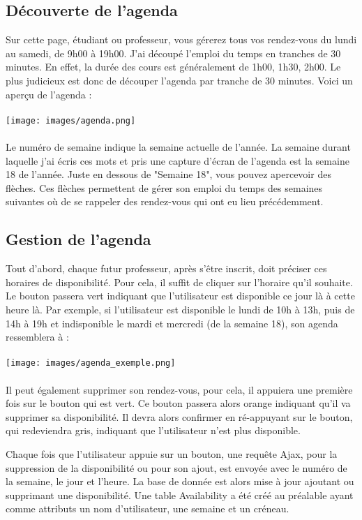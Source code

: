 \documentclass{article}%
\begin{document}
\subsection{Découverte de l'agenda}
Sur cette page, étudiant ou professeur, vous gérerez tous vos rendez-vous du lundi au samedi, de 9h00 à 19h00. J'ai découpé l'emploi du temps en tranches de 30 minutes. En effet, la durée des cours est généralement de 1h00, 1h30, 2h00. Le plus judicieux est donc de découper l'agenda par tranche de 30 minutes. Voici un aperçu de l'agenda : \\\\
\texttt{[image: images/agenda.png]}  \\\\
Le numéro de semaine indique la semaine actuelle de l'année. La semaine durant laquelle j'ai écris ces mots et pris une capture d'écran de l'agenda est la semaine 18 de l'année. Juste en dessous de "Semaine 18", vous pouvez apercevoir des flèches. Ces flèches permettent de gérer son emploi du temps des semaines suivantes où de se rappeler des rendez-vous qui ont eu lieu précédemment. 
\subsection{Gestion de l'agenda}
Tout d'abord, chaque futur professeur, après s'être inscrit, doit préciser ces horaires de disponibilité. Pour cela, il suffit de cliquer sur l'horaire qu'il souhaite. Le bouton passera vert indiquant que l'utilisateur est disponible ce jour là à cette heure là. Par exemple, si l'utilisateur est disponible le lundi de 10h à 13h, puis de 14h à 19h et indisponible le mardi et mercredi (de la semaine 18), son agenda ressemblera à :\\\\
\texttt{[image: images/agenda\_exemple.png]} 
\\\\
 Il peut également supprimer son rendez-vous, pour cela, il appuiera une première fois sur le bouton qui est vert. Ce bouton passera alors orange indiquant qu'il va supprimer sa disponibilité. Il devra alors confirmer en ré-appuyant sur le bouton, qui redeviendra gris, indiquant que l'utilisateur n'est plus disponible. 


Chaque fois que l'utilisateur appuie sur un bouton, une requête Ajax, pour la suppression de la disponibilité ou pour son ajout, est envoyée avec le numéro de la semaine, le jour et l'heure. La base de donnée est alors mise à jour ajoutant ou supprimant une disponibilité. Une table Availability a été créé au préalable ayant comme attributs un nom d'utilisateur, une semaine et un créneau. 
\end{document}
